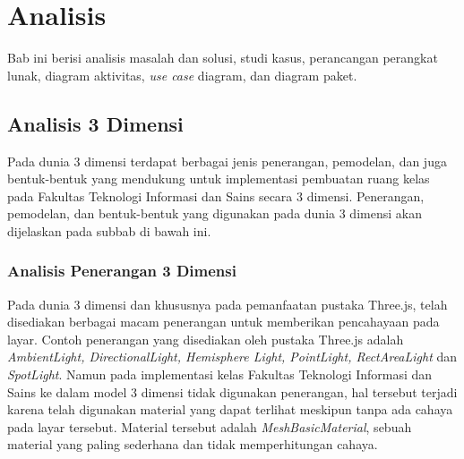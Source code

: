 \chapter{Analisis}
\label{chap:analisis}
Bab ini berisi analisis masalah dan solusi, studi kasus, perancangan perangkat lunak, diagram aktivitas, \textit{use case} diagram, dan diagram paket.


\section{Analisis 3 Dimensi}
\label{sec:3dimensi}

Pada dunia 3 dimensi terdapat berbagai jenis penerangan, pemodelan, dan juga bentuk-bentuk yang mendukung untuk implementasi pembuatan ruang kelas pada Fakultas Teknologi Informasi dan Sains secara 3 dimensi. Penerangan, pemodelan, dan bentuk-bentuk yang digunakan pada dunia 3 dimensi akan dijelaskan pada subbab di bawah ini.

\subsection{Analisis Penerangan 3 Dimensi}
\label{sec:lighting}
Pada dunia 3 dimensi dan khususnya pada pemanfaatan pustaka Three.js, telah disediakan berbagai macam penerangan untuk memberikan pencahayaan pada layar. Contoh penerangan yang disediakan oleh pustaka Three.js adalah {\it AmbientLight, DirectionalLight, Hemisphere Light, PointLight, RectAreaLight} dan {\it SpotLight}. Namun pada implementasi kelas Fakultas Teknologi Informasi dan Sains ke dalam model 3 dimensi tidak digunakan penerangan, hal tersebut terjadi karena telah digunakan material yang dapat terlihat meskipun tanpa ada cahaya pada layar tersebut. Material tersebut adalah {\it MeshBasicMaterial}, sebuah material yang paling sederhana dan tidak memperhitungan cahaya.

